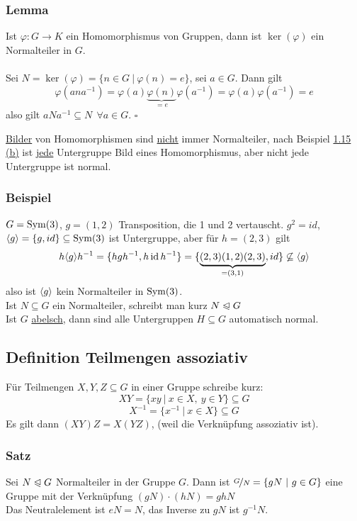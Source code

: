 \subsubsection*{Lemma}
Ist $\varphi: G \to K$ ein Homomorphismus von Gruppen, dann ist $\ker(\varphi)$ ein Normalteiler in $G$.\\

\\
Sei $N=\ker(\varphi)=\{n\in G~|~\varphi(n)=e\}$, sei $a\in G$. Dann gilt 
\[
\varphi(ana^{-1})=\varphi(a)\underbrace{\varphi(n)}_{=e}\varphi(a^{-1})=\varphi(a)\varphi(a^{-1})=e
\]
also gilt $aNa^{-1}\subseteq N~~\forall a\in G$.
\hfill $\square$

\uline{Bilder} von Homomorphismen sind \uline{nicht} immer Normalteiler, nach Beispiel \hyperref[sub:homomorphismen]{1.15 (b)} ist \uline{jede} Untergruppe Bild eines Homomorphismus, aber nicht jede Untergruppe ist normal.

\subsubsection*{Beispiel}
$G=\operatorname{Sym}(3)$, $g=(1,2)$ Transposition, die 1 und 2 vertauscht. $g^2=id$, $\langle g \rangle=\{g,id\}\subseteq \operatorname{Sym}(3)$ ist Untergruppe, aber für $h=(2,3)$ gilt 
\[
h\langle g \rangle h^{-1}=\{hgh^{-1}, h\operatorname{id} h^{-1} \} = \{\underbrace{(2,3)(1,2)(2,3)}_{=(3,1)}, id \} \not\subseteq \langle g \rangle
\]
also ist $\langle g \rangle$ kein Normalteiler in $\operatorname{Sym}(3)$.\\

 Ist $N\subseteq G$ ein Normalteiler, schreibt man kurz $N\trianglelefteqslant G$\\

 Ist $G$ \uline{abelsch}, dann sind alle Untergruppen $H\subseteq G$ automatisch normal.

\subsection{Definition Teilmengen assoziativ}
\label{sub:teilmengen}
Für Teilmengen $X,Y,Z \subseteq G$ in einer Gruppe schreibe kurz:\\
\[XY=\{xy~|~x\in X,~y\in Y\}\subseteq G \]
\[X^{-1}=\{x^{-1}~|~x\in X \}\subseteq G \]
Es gilt dann $(XY)Z=X(YZ)$, (weil die Verknüpfung assoziativ ist).
\subsubsection*{Satz}
Sei $N\trianglelefteqslant G$ Normalteiler in der Gruppe $G$. Dann ist $\nicefrac{G}{N}=\{gN~|~g\in G \}$ eine Gruppe mit der Verknüpfung $(gN)\cdot (hN)=ghN$\\
Das Neutralelement ist $eN=N$, das Inverse zu $gN$ ist $g^{-1}N$.\\

